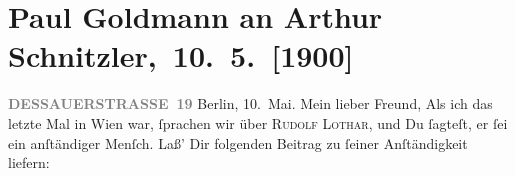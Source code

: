 

         
         \renewcommand{\erwaehntePersonen}{Personen: Moriz Benedikt, Paul Goldmann, Rudolf Lothar}
         \renewcommand{\erwaehnteInstitutionen}{Institutionen: Neue Freie Presse, Volkstheater}
         \renewcommand{\erwaehnteOrte}{Orte: Berlin, Dessauer Straße, Deutsches Theater Berlin, Europa, Wien}
         \renewcommand{\erwaehnteWerke}{Werke: König Harlekin. Maskenspiel in vier Aufzügen, Neue Freie Presse}
               \section[ Paul Goldmann an Arthur Schnitzler, 10. 5. {[}1900{]}]{ Paul Goldmann an Arthur Schnitzler, 10. 5. {[}1900{]}}\nopagebreak{}\rehead{ }\begin{ledgroupsized}[t]{13cm}\normalsize\beginnumbering{} \toendnotes[C]{\smallbreak\pagebreak[2]} 
\toendnotes[C]{\smallbreak}\pstart
           \noindent{}{\pb}\textcolor{gray}{\textbf{DESSAUERSTRASSE 19}}\pend
           \pstart
           \raggedleft{}Berlin, 10. Mai.\pend
           \pstart\center{}Mein lieber Freund,\pend\pstart
           Als ich das letzte Mal in Wien war, ſprachen wir
               über \textsc{Rudolf Lothar}, und Du ſagteſt, er ſei ein anſtändiger Menſch. Laß’ Dir folgenden Beitrag zu
               ſeiner Anſtändigkeit liefern:\pend
           \pstart

\end{ledgroupsized}
